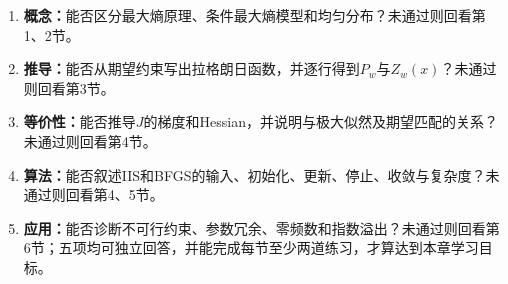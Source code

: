 \begin{SLCompactClosure}
\label{struct:V3-C01-CH36}

\label{struct:V3-C01-CH37}
\begin{selfcheckbox}
\begin{enumerate}[leftmargin=2.2em]
  \item \textbf{概念：}能否区分最大熵原理、条件最大熵模型和均匀分布？未通过则回看第1、2节。
  \item \textbf{推导：}能否从期望约束写出拉格朗日函数，并逐行得到$P_w$与$Z_w(x)$？未通过则回看第3节。
  \item \textbf{等价性：}能否推导$J$的梯度和Hessian，并说明与极大似然及期望匹配的关系？未通过则回看第4节。
  \item \textbf{算法：}能否叙述IIS和BFGS的输入、初始化、更新、停止、收敛与复杂度？未通过则回看第4、5节。
  \item \textbf{应用：}能否诊断不可行约束、参数冗余、零频数和指数溢出？未通过则回看第6节；五项均可独立回答，并能完成每节至少两道练习，才算达到本章学习目标。
\end{enumerate}
\end{selfcheckbox}
\end{SLCompactClosure}

